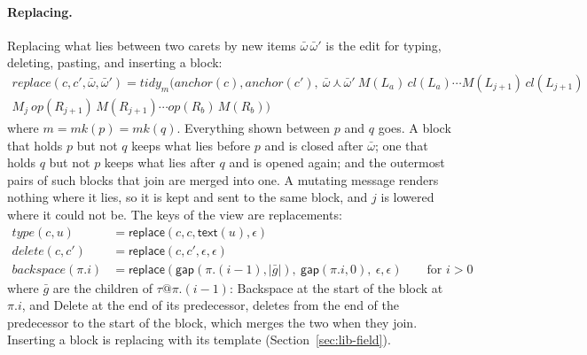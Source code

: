\documentclass[11pt]{article}
\numberwithin{equation}{section}
\newcommand{\kw}[1]{\ensuremath{\mathsf{#1}}}
\newcommand{\crt}{\mathord{\curlywedge}}
\begin{document}
\paragraph{Replacing.}
Replacing what lies between two carets by new items $\bar\omega\,\bar\omega'$
is the edit for typing, deleting, pasting, and inserting a block:
\begin{multline}\label{eq:edit-replace}
\mathit{replace}(c, c', \bar\omega, \bar\omega') =
\mathit{tidy}_m(\mathit{anchor}(c), \mathit{anchor}(c'),\
  \bar\omega\,\crt\,\bar\omega'\ M(L_a)\,\mathit{cl}(L_a) \cdots M(L_{j+1})\,\mathit{cl}(L_{j+1}) \\
  M_j\ \mathit{op}(R_{j+1})\,M(R_{j+1}) \cdots \mathit{op}(R_b)\,M(R_b))
\end{multline}
where $m = \mathit{mk}(p) = \mathit{mk}(q)$.  Everything shown between $p$
and $q$ goes.  A block that holds $p$ but not $q$ keeps what lies before
$p$ and is closed after $\bar\omega$; one that holds $q$ but not $p$ keeps
what lies after $q$ and is opened again; and the outermost pairs of such
blocks that join are merged into one.  A mutating message renders nothing
where it lies, so it is kept and sent to the same block, and $j$ is lowered
where it could not be.  The keys of the view are replacements:
\begin{equation}\label{eq:edit-keys}
\begin{aligned}
\mathit{type}(c, u) &= \kw{replace}(c, c, \kw{text}(u), \epsilon) \\
\mathit{delete}(c, c') &= \kw{replace}(c, c', \epsilon, \epsilon) \\
\mathit{backspace}(\pi.i) &= \kw{replace}(\kw{gap}(\pi.(i{-}1),
  |\bar g|),\ \kw{gap}(\pi.i, 0),\ \epsilon, \epsilon)
  \qquad \text{for } i > 0
\end{aligned}
\end{equation}
where $\bar g$ are the children of $\tau@\pi.(i{-}1)$: Backspace at the
start of the block at $\pi.i$, and Delete at the end of its predecessor,
deletes from the end of the predecessor to the start of the block, which
merges the two when they join.  Inserting a block is replacing with its
template (Section~\ref{sec:lib-field}).
\end{document}
